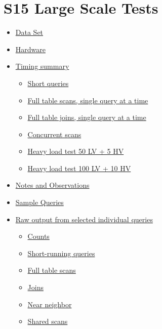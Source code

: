 \section{S15 Large Scale Tests}\label{s15-large-scale-tests}

\begin{itemize}
\item
  \protect\hyperlink{S15LargeScaleTests-DataSet}{Data Set}
\item
  \protect\hyperlink{S15LargeScaleTests-Hardware}{Hardware}
\item
  \protect\hyperlink{S15LargeScaleTests-Timingsummary}{Timing summary}

  \begin{itemize}
  \item
    \protect\hyperlink{S15LargeScaleTests-Shortqueries}{Short queries}
  \item
    \protect\hyperlink{S15LargeScaleTests-Fulltablescansux2csingl}{Full
    table scans, single query at a time}
  \item
    \protect\hyperlink{S15LargeScaleTests-Fulltablejoinsux2csingl}{Full
    table joins, single query at a time}
  \item
    \protect\hyperlink{S15LargeScaleTests-Concurrentscans}{Concurrent
    scans}
  \item
    \protect\hyperlink{S15LargeScaleTests-Heavyloadtest50LV+5H}{Heavy
    load test 50 LV + 5 HV}
  \item
    \protect\hyperlink{S15LargeScaleTests-Heavyloadtest100LV+1}{Heavy
    load test 100 LV + 10 HV}
  \end{itemize}
\item
  \protect\hyperlink{S15LargeScaleTests-NotesandObservations}{Notes and
  Observations}
\item
  \protect\hyperlink{S15LargeScaleTests-SampleQueries}{Sample Queries}
\item
  \protect\hyperlink{S15LargeScaleTests-Rawoutputfromselecte}{Raw output
  from selected individual queries}

  \begin{itemize}
  \item
    \protect\hyperlink{S15LargeScaleTests-Counts}{Counts}
  \item
    \protect\hyperlink{S15LargeScaleTests-Short-runningqueries}{Short-running
    queries}
  \item
    \protect\hyperlink{S15LargeScaleTests-Fulltablescans}{Full table
    scans}
  \item
    \protect\hyperlink{S15LargeScaleTests-Joins}{Joins}
  \item
    \protect\hyperlink{S15LargeScaleTests-Nearneighbor}{Near neighbor}
  \item
    \protect\hyperlink{S15LargeScaleTests-Sharedscans}{Shared scans}
  \end{itemize}
\end{itemize}


